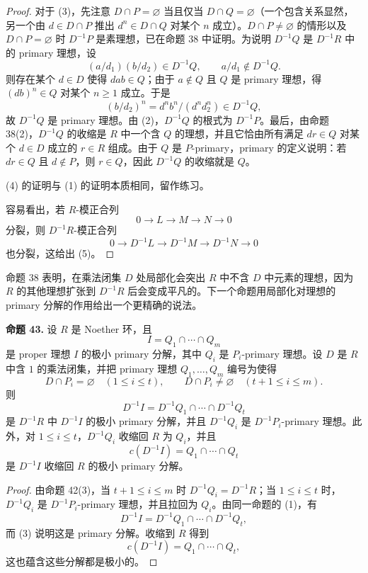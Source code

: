 \begin{proof}
	对于 (3)，先注意 $D\cap P=\varnothing$ 当且仅当 $D\cap Q=\varnothing$（一个包含关系显然，另一个由 $d\in D\cap P$ 推出 $d^n\in D\cap Q$ 对某个 $n$ 成立）。$D\cap P\ne\varnothing$ 的情形以及 $D\cap P=\varnothing$ 时 $D^{-1}P$ 是素理想，已在命题 38 中证明。为说明 $D^{-1}Q$ 是 $D^{-1}R$ 中的 primary 理想，设
	\[
	(a/d_1)(b/d_2)\in D^{-1}Q,
	\qquad
	a/d_1\notin D^{-1}Q.
	\]
	则存在某个 $d\in D$ 使得 $dab\in Q$；由于 $a\notin Q$ 且 $Q$ 是 primary 理想，得 $(db)^n\in Q$ 对某个 $n\ge1$ 成立。于是
	\[
	(b/d_2)^n=d^nb^n/(d^nd_2^n)\in D^{-1}Q,
	\]
	故 $D^{-1}Q$ 是 primary 理想。由 (2)，$D^{-1}Q$ 的根式为 $D^{-1}P$。最后，由命题 38(2)，$D^{-1}Q$ 的收缩是 $R$ 中一个含 $Q$ 的理想，并且它恰由所有满足 $dr\in Q$ 对某个 $d\in D$ 成立的 $r\in R$ 组成。由于 $Q$ 是 $P$-primary，primary 的定义说明：若 $dr\in Q$ 且 $d\notin P$，则 $r\in Q$，因此 $D^{-1}Q$ 的收缩就是 $Q$。
	
	(4) 的证明与 (1) 的证明本质相同，留作练习。
	
	容易看出，若 $R$-模正合列
	\[
	0\longrightarrow L\longrightarrow M\longrightarrow N\longrightarrow0
	\]
	分裂，则 $D^{-1}R$-模正合列
	\[
	0\longrightarrow D^{-1}L\longrightarrow D^{-1}M\longrightarrow D^{-1}N\longrightarrow0
	\]
	也分裂，这给出 (5)。
\end{proof}

命题 38 表明，在乘法闭集 $D$ 处局部化会突出 $R$ 中不含 $D$ 中元素的理想，因为 $R$ 的其他理想扩张到 $D^{-1}R$ 后会变成平凡的。下一个命题用局部化对理想的 primary 分解的作用给出一个更精确的说法。

\noindent\textbf{命题 43.} 设 $R$ 是 Noether 环，且
\[
I=Q_1\cap\cdots\cap Q_m
\]
是 proper 理想 $I$ 的极小 primary 分解，其中 $Q_i$ 是 $P_i$-primary 理想。设 $D$ 是 $R$ 中含 $1$ 的乘法闭集，并把 primary 理想 $Q_1,\ldots,Q_m$ 编号为使得
\[
D\cap P_i=\varnothing\quad(1\le i\le t),
\qquad
D\cap P_i\ne\varnothing\quad(t+1\le i\le m).
\]
则
\[
D^{-1}I=D^{-1}Q_1\cap\cdots\cap D^{-1}Q_t
\]
是 $D^{-1}R$ 中 $D^{-1}I$ 的极小 primary 分解，并且 $D^{-1}Q_i$ 是 $D^{-1}P_i$-primary 理想。此外，对 $1\le i\le t$，$D^{-1}Q_i$ 收缩回 $R$ 为 $Q_i$，并且
\[
c(D^{-1}I)=Q_1\cap\cdots\cap Q_t
\]
是 $D^{-1}I$ 收缩回 $R$ 的极小 primary 分解。

\begin{proof}
	由命题 42(3)，当 $t+1\le i\le m$ 时 $D^{-1}Q_i=D^{-1}R$；当 $1\le i\le t$ 时，$D^{-1}Q_i$ 是 $D^{-1}P_i$-primary 理想，并且拉回为 $Q_i$。由同一命题的 (1)，有
	\[
	D^{-1}I=D^{-1}Q_1\cap\cdots\cap D^{-1}Q_t,
	\]
	而 (3) 说明这是 primary 分解。收缩到 $R$ 得到
	\[
	c(D^{-1}I)=Q_1\cap\cdots\cap Q_t,
	\]
	这也蕴含这些分解都是极小的。
\end{proof}


